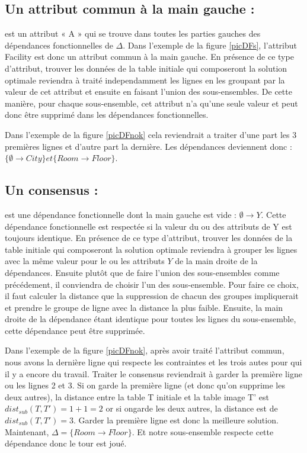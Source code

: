 \documentclass[12pt, a4paper, oneside, titlepage]{book}%
\begin{document}
\subsection{Un attribut commun à la main gauche : } 
est un attribut « A » qui se trouve dans toutes les parties gauches des dépendances fonctionnelles de $\Delta$. Dans l'exemple de la figure \ref{picDFs}, l'attribut \fg Facility \og est donc un attribut commun à la main gauche. En présence de ce type d'attribut, trouver les données de la table initiale qui composeront la solution optimale reviendra à traité independamment les lignes en les groupant par la valeur de cet attribut et ensuite en faisant l'union des sous-ensembles.  De cette manière, pour chaque sous-ensemble, cet attribut n'a qu'une seule valeur et peut donc être supprimé dans les dépendances fonctionnelles.

Dans l'exemple de la figure \ref{picDFnok} cela reviendrait a traiter d'une part les 3 premières lignes et d'autre part la dernière. Les dépendances deviennent donc : $\{ \emptyset \rightarrow City \} et \{  Room \rightarrow Floor \}$.

\subsection{Un consensus : } 
est une dépendance fonctionnelle dont la main gauche est vide : $\emptyset \rightarrow Y$. Cette dépendance fonctionnelle est respectée si la valeur du ou des attributs de Y est toujours identique. En présence de ce type d'attribut, trouver les données de la table initiale qui composeront la solution optimale reviendra à grouper les lignes avec la même valeur pour le ou les attributs $Y$ de la main droite de la dépendances. Ensuite plutôt que de faire l'union des sous-ensembles comme précédement, il conviendra de choisir l'un des sous-ensemble. Pour faire ce choix, il faut calculer la distance que la suppression de chacun des groupes impliquerait et prendre le groupe de ligne avec la distance la plus faible. Ensuite, la main droite de la dépendance étant identique pour toutes les lignes du sous-ensemble, cette dépendance peut être supprimée.

Dans l'exemple de la figure \ref{picDFnok}, après avoir traité l'attribut commun, nous avons la dernière ligne qui respecte les contraintes et les trois autes pour qui il y a encore du travail. Traiter le consensus reviendrait à garder la première ligne ou les lignes 2 et 3. Si on garde la première ligne (et donc qu'on supprime les deux autres), la distance entre la table T initiale et la table image T' est $dist_{sub}(T, T') = 1+ 1 = 2$ or si ongarde les deux autres, la distance est de $dist_{sub}(T, T') = 3$. Garder la première ligne est donc la meilleure solution. Maintenant, $\Delta = \{  Room \rightarrow Floor \}$. Et notre sous-ensemble respecte cette dépendance donc le tour est joué.
\end{document}
